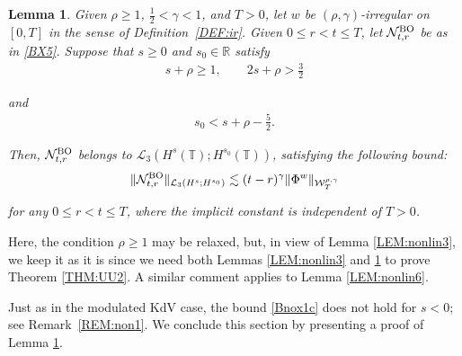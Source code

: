 \documentclass[letterpaper, 11pt,  reqno]{amsart}
\newtheorem{lemma}[theorem]{Lemma}
\newcommand{\1}{\hspace{0.5mm}\text{I}\hspace{0.5mm}}
\newcommand{\noi}{\noindent}
\newcommand{\R}{\mathbb{R}}
\newcommand{\T}{\mathbb{T}}
\renewcommand{\L}{\mathcal{L}}
\newcommand{\g}{\gamma}
\newcommand{\les}{\lesssim}
\newcommand{\NN}{\mathcal{N}}
\newcommand{\W}{\mathcal{W}}
\newcommand{\BO}{\text{\rm BO} }
\numberwithin{equation}{section}
\numberwithin{theorem}{section}
\begin{document}
\begin{lemma}\label{LEM:nonlin4}
Given $\rho \ge1$,  $\frac12< \g < 1$, and $T> 0$, 
let  $w$ be $(\rho,\g)$-irregular on $[0, T]$ in the sense of Definition~\ref{DEF:ir}.
Given $0 \le r < t \le T$, let $\NN^\BO_{t, r}$
be as in \eqref{BX5}.
Suppose that $s\ge 0$ and $s_0 \in \R$ satisfy
\begin{align}
s + \rho \ge  1, \qquad 2s + \rho > \frac 32
\label{Bnox1a}
\end{align}

\noi
and 
\begin{align}
s_0 < s + \rho - \frac 52.
\label{Bnox1b}
\end{align}

\noi
Then, 
$\NN_{t, r}^\BO$  belongs to $\L_3(H^s(\T); H^{s_0}(\T))$, 
satisfying
 the following bound\textup{:}
\begin{align}
 \|\NN^\BO_{t, r}\|_{\L_3(H^s; H^{s_0})}
\les 
(t- r)^\g  \|\Phi^w\|_{  \W^{\rho,\g}_T}
\label{Bnox1c}
\end{align}

\noi
for any $0 \le r <  t \le T$, 
where the implicit constant is independent of $T > 0$.


\end{lemma}


Here, the condition $\rho \ge 1$ may be relaxed, 
but, in view of Lemma \ref{LEM:nonlin3}, 
 we keep it as it is since we need both Lemmas \ref{LEM:nonlin3}
 and \ref{LEM:nonlin4} to prove Theorem \ref{THM:UU2}.
A similar comment applies to Lemma \ref{LEM:nonlin6}.

Just as in the modulated KdV case, 
the bound \eqref{Bnox1c}
does not hold for $s < 0$; see
Remark~\ref{REM:non1}.
We conclude this section by  presenting a proof of  Lemma \ref{LEM:nonlin4}.
\end{document}
